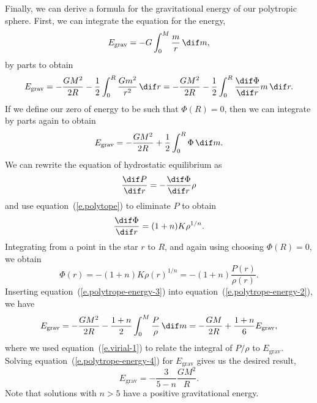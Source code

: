Finally, we can derive a formula for the gravitational energy of our polytropic sphere.  First, we can integrate the equation for the energy,
\[
E_{\mathrm{grav}} = -G\int_{0}^{M}\frac{m}{r}\,\dif m,
\]
by parts to obtain
\begin{equation}\label{e.polytrope-energy-1}
E_{\mathrm{grav}} = -\frac{GM^{2}}{2R} - \frac{1}{2}\int_{0}^{R}\frac{Gm^{2}}{r^{2}}\,\dif r = -\frac{GM^{2}}{2R} - \frac{1}{2}\int_{0}^{R} \frac{\dif\Phi}{\dif r} m\,\dif r.
\end{equation}
If we define our zero of energy to be such that $\Phi(R) = 0$, then we can integrate by parts again to obtain
\begin{equation}\label{e.polytrope-energy-2}
E_{\mathrm{grav}} = -\frac{GM^{2}}{2R} + \frac{1}{2}\int_{0}^{R} \Phi\,\dif m.
\end{equation}
We can rewrite the equation of hydrostatic equilibrium as
\[ \frac{\dif P}{\dif r} = -\frac{\dif\Phi}{\dif r} \rho \]
and use equation~(\ref{e.polytope}) to eliminate $P$ to obtain
\[ \frac{\dif\Phi}{\dif r} = (1+n) K \rho^{1/n} .\]
Integrating from a point in the star $r$ to $R$, and again using choosing $\Phi(R) = 0$, we obtain
\begin{equation}\label{e.polytrope-energy-3}
\Phi(r) = -(1+n)K\rho(r)^{1/n} = -(1+n)\frac{P(r)}{\rho(r)}.
\end{equation}
Inserting equation~(\ref{e.polytrope-energy-3}) into equation~(\ref{e.polytrope-energy-2}), we have
\begin{equation}\label{e.polytrope-energy-4}
E_{\mathrm{grav}} = -\frac{GM^{2}}{2R} - \frac{1+n}{2}\int_{0}^{M} \frac{P}{\rho}\,\dif m = -\frac{GM}{2R} + \frac{1+n}{6}E_{\mathrm{grav}},
\end{equation}
where we used equation~(\ref{e.virial-1}) to relate the integral of $P/\rho$ to $E_{\mathrm{grav}}$. Solving equation~(\ref{e.polytrope-energy-4}) for $E_{\mathrm{grav}}$ gives us the desired result,
\begin{equation}\label{e.polytrope-energy}
E_{\mathrm{grav}} = -\frac{3}{5-n} \frac{GM^{2}}{R}.
\end{equation}
Note that solutions with $n > 5$ have a positive gravitational energy.

